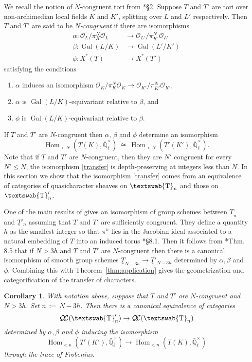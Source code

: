 \documentclass{amsart}
\theoremstyle{plain}
\newtheorem{corollary}[theorem]{Corollary}
\theoremstyle{definition}
\theoremstyle{remark}
\newcommand{\EE}{\mathbb{\bar Q}_\ell}
\newcommand{\OK}{\mathcal{O}_K}
\newcommand{\OL}{\mathcal{O}_L}
\newcommand{\OO}[1]{\mathcal{O}_{#1}}
\newcommand{\EEx}{\EE^\times}
\newcommand{\mathswab}[1]{\operatorname{\textswab{#1}}}
\newcommand{\GN}[1]{\mathswab{#1}}
\newcommand{\TT}{\underline{T}}
\DeclareMathOperator{\Gal}{Gal}
\DeclareMathOperator{\Hom}{Hom}
\newcommand{\ceq}{{\, :=\, }}
\newcommand{\iso}{{\ \cong\ }}
\newcommand{\QC}{{\mathcal{Q\hskip-0.8pt C}}}
\begin{document}
We recall the notion of $N$-congruent tori from \cite{chai-yu:01a}*{\S 2}.
Suppose $T$ and $T'$ are tori over non-archimedian local fields $K$ and $K'$,
splitting over $L$ and $L'$ respectively.
Then $T$ and $T'$ are said to be \emph{$N$-congruent} if there are isomorphisms
 \begin{align*}
  \alpha : \OL/\pi_K^N \OL &\to \OO{L'}/\pi_{K'}^N \OO{L'} \\
  \beta : \Gal(L/K) &\to \Gal(L'/K') \\
  \phi : X^*(T) &\to X^*(T')
 \end{align*}
 satisfying the conditions
 \begin{enumerate}
  \item $\alpha$ induces an isomorphism $\OK/\pi_K^N \OK \to \OO{K'}/\pi_{K'}^N \OO{K'}$,
  \item $\alpha$ is $\Gal(L/K)$-equivariant relative to $\beta$, and
  \item $\phi$ is $\Gal(L/K)$-equivariant relative to $\beta$.
 \end{enumerate}
If $T$ and $T'$ are $N$-congruent then $\alpha$, $\beta$ and $\phi$ determine an isomorphism
\begin{equation}\label{transfer}
  \Hom_{<N}(T(K), \EEx) \iso \Hom_{<N}(T'(K'),\EEx).
\end{equation}
Note that if $T$ and $T'$ are $N$-congruent, then they are $N'$ congruent for every
$N' \leq N$, the isomorphism \eqref{transfer} is depth-preserving at integers less than $N$.
In this section we show that the isomorphism \eqref{transfer} comes from an equivalence of
categories of quasicharacter sheaves on $\GN{T}_n$ and those on $\GN{T}'_n$.

One of the main results of \cite{chai-yu:01a} gives an isomorphism of group schemes between
$\TT_n$ and $\TT'_n$ assuming that $T$ and $T'$ are sufficiently congruent.
They define a quantity $h$ as the smallest integer so that $\pi^h$ lies in the
Jacobian ideal associated to a natural embedding of $T$ into an induced torus \cite{chai-yu:01a}*{\S 8.1}.
Then it follows from \cite{chai-yu:01a}*{Thm. 8.5} that if $N > 3h$ and $T$ and $T'$ are $N$-congruent
then there is a canonical isomorphism of smooth group schemes
 $
  \TT_{N-3h} \to \TT'_{N-3h}
 $
 determined by $\alpha, \beta$ and $\phi$.
Combining this with Theorem~\ref{thm:application} gives the geometrization and categorification of the transfer of characters.

\begin{corollary}\label{cor:transfer}
 With notation above, suppose that $T$ and $T'$ are $N$-congruent and $N > 3h$.  Set $n \ceq N-3h$.
 Then there is a canonical equivalence of categories
 \[
  \QC(\GN{T}'_{n}) \to \QC(\GN{T}_{n})
 \]
 determined by $\alpha, \beta$ and $\phi$ inducing the isomorphism
 \[
  \Hom_{<n}(T'(K'), \EEx) \to \Hom_{<n}(T(K), \EEx)
 \]
 through the trace of Frobenius.
\end{corollary}
\end{document}
